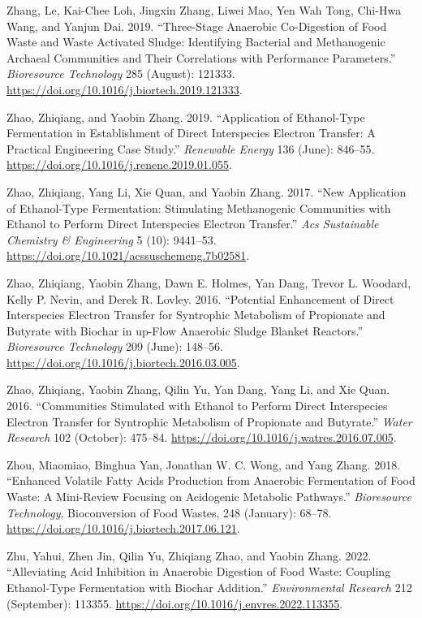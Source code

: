 \documentclass[11pt]{report}
\begin{document}
\begin{hangparas}{1.5em}{1}
\hypertarget{citeproc_bib_item_90}{Zhang, Le, Kai-Chee Loh, Jingxin Zhang, Liwei Mao, Yen Wah Tong, Chi-Hwa Wang, and Yanjun Dai. 2019. “Three-Stage Anaerobic Co-Digestion of Food Waste and Waste Activated Sludge: Identifying Bacterial and Methanogenic Archaeal Communities and Their Correlations with Performance Parameters.” \textit{Bioresource Technology} 285 (August): 121333. \url{https://doi.org/10.1016/j.biortech.2019.121333}.}

\hypertarget{citeproc_bib_item_91}{Zhao, Zhiqiang, and Yaobin Zhang. 2019. “Application of Ethanol-Type Fermentation in Establishment of Direct Interspecies Electron Transfer: A Practical Engineering Case Study.” \textit{Renewable Energy} 136 (June): 846–55. \url{https://doi.org/10.1016/j.renene.2019.01.055}.}

\hypertarget{citeproc_bib_item_92}{Zhao, Zhiqiang, Yang Li, Xie Quan, and Yaobin Zhang. 2017. “New Application of Ethanol-Type Fermentation: Stimulating Methanogenic Communities with Ethanol to Perform Direct Interspecies Electron Transfer.” \textit{Acs Sustainable Chemistry \& Engineering} 5 (10): 9441–53. \url{https://doi.org/10.1021/acssuschemeng.7b02581}.}

\hypertarget{citeproc_bib_item_93}{Zhao, Zhiqiang, Yaobin Zhang, Dawn E. Holmes, Yan Dang, Trevor L. Woodard, Kelly P. Nevin, and Derek R. Lovley. 2016. “Potential Enhancement of Direct Interspecies Electron Transfer for Syntrophic Metabolism of Propionate and Butyrate with Biochar in up-Flow Anaerobic Sludge Blanket Reactors.” \textit{Bioresource Technology} 209 (June): 148–56. \url{https://doi.org/10.1016/j.biortech.2016.03.005}.}

\hypertarget{citeproc_bib_item_94}{Zhao, Zhiqiang, Yaobin Zhang, Qilin Yu, Yan Dang, Yang Li, and Xie Quan. 2016. “Communities Stimulated with Ethanol to Perform Direct Interspecies Electron Transfer for Syntrophic Metabolism of Propionate and Butyrate.” \textit{Water Research} 102 (October): 475–84. \url{https://doi.org/10.1016/j.watres.2016.07.005}.}

\hypertarget{citeproc_bib_item_95}{Zhou, Miaomiao, Binghua Yan, Jonathan W. C. Wong, and Yang Zhang. 2018. “Enhanced Volatile Fatty Acids Production from Anaerobic Fermentation of Food Waste: A Mini-Review Focusing on Acidogenic Metabolic Pathways.” \textit{Bioresource Technology}, Bioconversion of Food Wastes, 248 (January): 68–78. \url{https://doi.org/10.1016/j.biortech.2017.06.121}.}

\hypertarget{citeproc_bib_item_96}{Zhu, Yahui, Zhen Jin, Qilin Yu, Zhiqiang Zhao, and Yaobin Zhang. 2022. “Alleviating Acid Inhibition in Anaerobic Digestion of Food Waste: Coupling Ethanol-Type Fermentation with Biochar Addition.” \textit{Environmental Research} 212 (September): 113355. \url{https://doi.org/10.1016/j.envres.2022.113355}.}


\end{hangparas}
\end{document}

